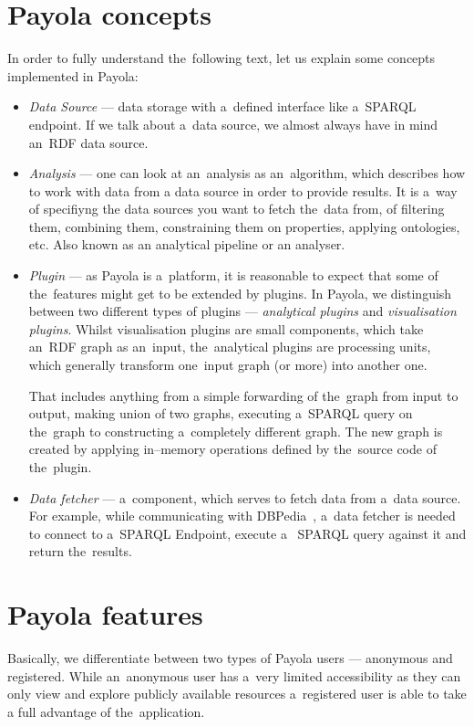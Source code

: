 \section{Payola concepts}
In order to fully understand the~following text, let us explain some concepts 
implemented in Payola:
\begin{itemize}
  \item \emph{Data Source} --- data storage with a~defined interface like a~SPARQL endpoint.
  If we talk about a~data source, we almost always have in mind an~RDF data source.
  
  \item \emph{Analysis} --- one can look at an~analysis as an~algorithm, which 
  describes how to work with data from a data source in order to provide results. 
  It is a~way of specifiyng the data sources you want to fetch the~data from, 
  of filtering them, combining them, constraining them on properties, applying 
  ontologies, etc. Also known as an analytical pipeline or an analyser.  
  
  \item \emph{Plugin} --- as Payola is a~platform, it is reasonable to expect that 
  some of the~features might get to be extended by plugins. In 
  Payola, we distinguish between two different types of plugins --- \emph{analytical plugins} and 
  \emph{visualisation plugins}. Whilst visualisation plugins are small components, 
  which take an~RDF graph as an~input, the~analytical plugins are processing 
  units, which generally transform one~input graph (or more) into another one.
  
  That includes anything from a simple forwarding of the~graph from input to output, 
  making union of two graphs, executing a~SPARQL query on the~graph to constructing 
  a~completely different graph. The new graph is created by applying in--memory
  operations defined by the~source code of the~plugin.
  
  \item \emph{Data fetcher} --- a~component, which serves to fetch data from a~data 
  source. For example, while communicating with DBPedia~\cite{dbpedia},
  a~data fetcher is needed to connect to a~SPARQL Endpoint, execute a~
  SPARQL query against it and return the~results.
\end{itemize}

\section{Payola features}
Basically, we differentiate between two types of Payola users --- anonymous and registered. 
While an~anonymous user has a~very limited accessibility as they can only 
view and explore publicly available resources a~registered user is able to 
take a full advantage of the~application.

